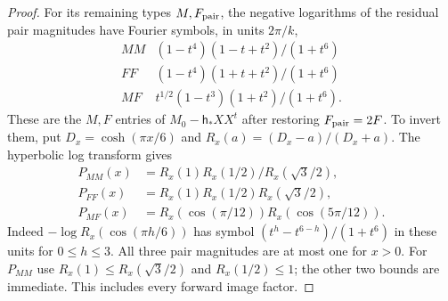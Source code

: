 \begin{proof}
For its remaining types $M,F_{\rm pair}$, the negative logarithms of
the residual pair magnitudes have Fourier symbols, in units $2\pi/k$,
\[
\begin{array}{c|c}
 MM&(1-t^4)(1-t+t^2)/(1+t^6)\\
 FF&(1-t^4)(1+t+t^2)/(1+t^6)\\
 MF&t^{1/2}(1-t^3)(1+t^2)/(1+t^6).
\end{array}
\]
These are the $M,F$ entries of $M_0-\mathsf h_*XX^t$ after restoring
$F_{\rm pair}=2F$. To invert them, put
$D_x=\cosh(\pi x/6)$ and $R_x(a)=(D_x-a)/(D_x+a)$. The hyperbolic log
transform gives
\[
\begin{aligned}
 P_{MM}(x)&=R_x(1)R_x(1/2)/R_x(\sqrt3/2),\\
 P_{FF}(x)&=R_x(1)R_x(1/2)R_x(\sqrt3/2),\\
 P_{MF}(x)&=R_x(\cos(\pi/12))R_x(\cos(5\pi/12)).
\end{aligned}
\]
Indeed $-\log R_x(\cos(\pi h/6))$ has symbol
$(t^h-t^{6-h})/(1+t^6)$ in these units for $0\le h\le3$. All three pair magnitudes are
at most one for $x>0$. For $P_{MM}$ use
$R_x(1)\le R_x(\sqrt3/2)$ and $R_x(1/2)\le1$; the other two bounds are
immediate. This includes every forward image factor.


\end{proof}
